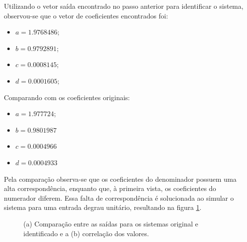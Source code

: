 Utilizando o vetor saída encontrado no passo anterior para identificar o sistema, observou-se que o vetor de coeficientes encontrados foi:

\begin{itemize}
    \item $a = 1.9768486$;
    \item $b = 0.9792891$;
    \item $c = 0.0008145$;
    \item $d = 0.0001605$;
\end{itemize}

Comparando com os coeficientes originais:

\begin{itemize}
    \item $a = 1.977724$;
    \item $b = 0.9801987$
    \item $c = 0.0004966$
    \item $d = 0.0004933$
\end{itemize}

Pela comparação observa-se que os coeficientes do denominador possuem uma alta correspondência, enquanto que, à primeira vista, os coeficientes do numerador diferem. Essa falta de correspondência é solucionada ao simular o sistema para uma entrada degrau unitário, resultando na figura \ref{id:est:corr}.

\begin{figure}[H]
\begin{center}
\end{center}
\caption{(a) Comparação entre as saídas para os sistemas original e identificado e a (b) correlação dos valores.}
\label{id:est:corr} 
\end{figure}

